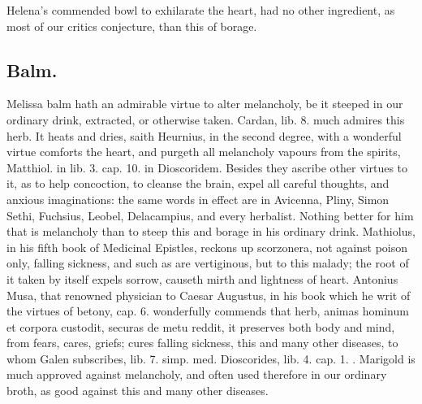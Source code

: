 {Helena's commended bowl to exhilarate the heart, had no other
ingredient, as most of our critics conjecture, than this of borage.
\subsection{Balm.}
Melissa balm hath an admirable virtue to alter melancholy, be
it steeped in our ordinary drink, extracted, or otherwise taken.
Cardan, lib. 8. much admires this herb. It heats and dries, saith
 Heurnius, in the second degree, with a wonderful virtue comforts
the heart, and purgeth all melancholy vapours from the spirits,
Matthiol. in lib. 3. cap. 10. in Dioscoridem. Besides they ascribe
other virtues to it, as to help concoction, to cleanse the brain,
expel all careful thoughts, and anxious imaginations: the same words in
effect are in Avicenna, Pliny, Simon Sethi, Fuchsius, Leobel,
Delacampius, and every herbalist. Nothing better for him that is
melancholy than to steep this and borage in his ordinary drink.
Mathiolus, in his fifth book of Medicinal Epistles, reckons up
scorzonera, not against poison only, falling sickness, and such
as are vertiginous, but to this malady; the root of it taken by itself
expels sorrow, causeth mirth and lightness of heart.
Antonius Musa, that renowned physician to Caesar Augustus, in his book
which he writ of the virtues of betony, cap. 6. wonderfully commends
that herb, animas hominum et corpora custodit, securas de metu reddit,
it preserves both body and mind, from fears, cares, griefs; cures
falling sickness, this and many other diseases, to whom Galen
subscribes, lib. 7. simp. med. Dioscorides, lib. 4. cap. 1. \etc{}.
Marigold is much approved against melancholy, and often used therefore
in our ordinary broth, as good against this and many other diseases.
}
